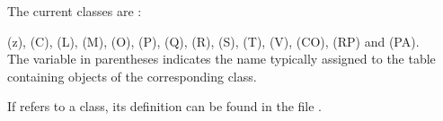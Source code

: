 The current classes are :

  (z),  (C),  (L),  (M),  (O),  (P),  (Q),  (R),  (S),  (T),  (V),  (CO),    (RP) and  (PA).\\
 
  The variable in parentheses indicates the name typically assigned to the table containing objects of the corresponding class.  

If  refers to a class, its definition can be found in the file .
     


